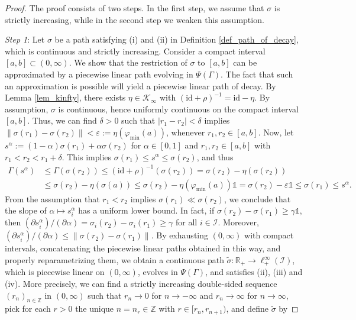 \documentclass[10pt, oneside, a4paper]{article}
\newcommand{\Z}{\mathbb{Z}}
\newcommand{\R}{\mathbb{R}}
\newcommand{\ep}{\varepsilon}
\newcommand{\unit}{\mathds{1}}
\newcommand{\id}{\mathrm{id}}
\newcommand{\IC}{\mathcal{I}}
\newcommand{\KC}{\mathcal{K}}
\begin{document}
\begin{proof}
The proof consists of two steps. In the first step, we assume that $\sigma$ is strictly increasing, while in the second step we weaken this assumption.%

\emph{Step 1}: Let $\sigma$ be a path satisfying (i) and (ii) in Definition \ref{def_path_of_decay}, which is continuous and strictly increasing. Consider a compact interval $[a,b] \subset (0,\infty)$. We show that the restriction of $\sigma$ to $[a,b]$ can be approximated by a piecewise linear path evolving in $\Psi(\Gamma)$. The fact that such an approximation is possible will yield a piecewise linear path of decay. By Lemma \ref{lem_kinfty}, there exists $\eta \in \KC_{\infty}$ with $(\id + \rho)^{-1} = \id - \eta$. By assumption, $\sigma$ is continuous, hence uniformly continuous on the compact interval $[a,b]$. Thus, we can find $\delta > 0$ such that $|r_1 - r_2| < \delta$ implies $\|\sigma(r_1) - \sigma(r_2)\| < \ep := \eta(\varphi_{\min}(a))$, whenever $r_1,r_2 \in [a,b]$. Now, let $s^{\alpha} := (1 - \alpha)\sigma(r_1) + \alpha\sigma(r_2)$ for $\alpha \in [0,1]$ and $r_1,r_2 \in [a,b]$ with $r_1 < r_2 < r_1 + \delta$. This implies $\sigma(r_1) \leq s^{\alpha} \leq \sigma(r_2)$, and thus%
\begin{align*}
  \Gamma(s^{\alpha}) &\leq \Gamma(\sigma(r_2)) \leq (\id + \rho)^{-1}(\sigma(r_2)) = \sigma(r_2) - \eta(\sigma(r_2)) \\
	                   &\leq \sigma(r_2) - \eta(\sigma(a)) \leq \sigma(r_2) - \eta(\varphi_{\min}(a))\unit = \sigma(r_2) - \ep\unit \leq \sigma(r_1) \leq s^{\alpha}.%
\end{align*}
From the assumption that $r_1 < r_2$ implies $\sigma(r_1) \ll \sigma(r_2)$, we conclude that the slope of $\alpha \mapsto s^{\alpha}_i$ has a uniform lower bound. In fact, if $\sigma(r_2) - \sigma(r_1) \geq \gamma\unit$, then $(\partial s^{\alpha}_i)/(\partial \alpha) = \sigma_i(r_2) - \sigma_i(r_1) \geq \gamma$ for all $i \in \IC$. Moreover, $(\partial s_i^{\alpha})/(\partial \alpha) \leq \|\sigma(r_2) - \sigma(r_1)\|$. By exhausting $(0,\infty)$ with compact intervals, concatenating the piecewise linear paths obtained in this way, and properly reparametrizing them, we obtain a continuous path $\tilde{\sigma}:\R_+ \rightarrow \ell^{\infty}_+(\IC)$, which is piecewise linear on $(0,\infty)$, evolves in $\Psi(\Gamma)$, and satisfies (ii), (iii) and (iv). More precisely, we can find a strictly increasing double-sided sequence $(r_n)_{n\in\Z}$ in $(0,\infty)$ such that $r_n \rightarrow 0$ for $n \rightarrow -\infty$ and $r_n \rightarrow \infty$ for $n \rightarrow \infty$, pick for each $r > 0$ the unique $n = n_r \in \Z$ with $r \in [r_n,r_{n+1})$, and define $\tilde{\sigma}$ by%

\end{proof}
\end{document}
